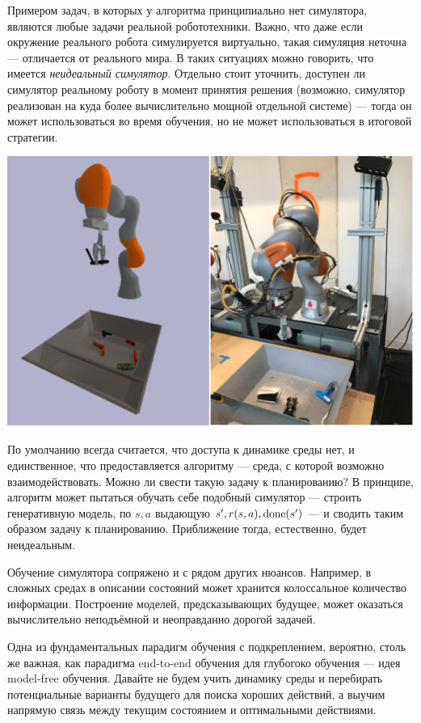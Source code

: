 \begin{exampleBox}[righthand ratio=0.25, sidebyside, sidebyside align=center, lower separated=false]{}
Примером задач, в которых у алгоритма принципиально нет симулятора, являются любые задачи реальной робототехники. Важно, что даже если окружение реального робота симулируется виртуально, такая симуляция неточна --- отличается от реального мира. В таких ситуациях можно говорить, что имеется \emph{неидеальный симулятор}. Отдельно стоит уточнить, доступен ли симулятор реальному роботу в момент принятия решения (возможно, симулятор реализован на куда более вычислительно мощной отдельной системе) --- тогда он может использоваться во время обучения, но не может использоваться в итоговой стратегии.

\tcblower
\includegraphics[width=\textwidth]{Images/realsim.png}
\end{exampleBox}

По умолчанию всегда считается, что доступа к динамике среды нет, и единственное, что предоставляется алгоритму --- среда, с которой возможно взаимодействовать. Можно ли свести такую задачу к планированию? В принципе, алгоритм может пытаться обучать себе подобный симулятор --- строить генеративную модель, по $s, a$ выдающую $s', r(s, a), \mathrm{done}(s')$ --- и сводить таким образом задачу к планированию. Приближение тогда, естественно, будет неидеальным.

Обучение симулятора сопряжено и с рядом других нюансов. Например, в сложных средах в описании состояний может хранится колоссальное количество информации. Построение моделей, предсказывающих будущее, может оказаться вычислительно неподъёмной и неоправданно дорогой задачей. 

Одна из фундаментальных парадигм обучения с подкреплением, вероятно, столь же важная, как парадигма end-to-end обучения для глубогоко обучения --- идея model-free обучения. Давайте не будем учить динамику среды и перебирать потенциальные варианты будущего для поиска хороших действий, а выучим напрямую связь между текущим состоянием и оптимальными действиями.

